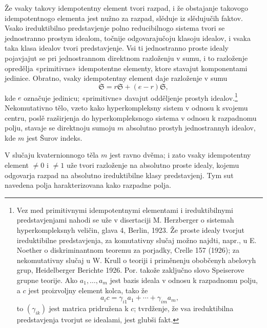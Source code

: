 \documentclass[11pt]{article}
\newcommand{\mS}{\mathfrak{S}}
\begin{document}
\noindent Že vsaky takovy idempotentny element tvori razpad, i že obstajanje takovogo idempotentnogo elementa jest nužno za razpad, slěduje iz slědujučih faktov. Vsako ireduktibilno predstavjenje polno reducibilnogo sistema tvori se jednostranno prostym idealom, točnije odgovarajučoju klasoju idealov, i vsaka taka klasa idealov tvori predstavjenje. Vsi ti jednostranno proste idealy pojavjajut se pri jednostrannom direktnom razloženju v sumu, i to razloženje opredělja «primitivne» idempotentne elementy, ktore stavajut komponentami jedinice. Obratno, vsaky idempotentny element daje razloženje v sumu
\[
        \mS=r\mS+(e-r)\mS,
\]
kde $e$ označuje jedinicu; «primitivne» davajut odděljenje prostyh idealov.\footnote{Vez med primitivnymi idempotentnymi elementami i ireduktibilnymi predstavjenjami nahodi se uže v disertaciji M. Herzberger o sistemah hyperkompleksnyh veličin, glava 4, Berlin, 1923. Že proste idealy tvorjut ireduktibilne predstavjenja, za komutativny slučaj možno najdti, napr., u E. Noether o diskriminantnom teoremu za porjadky, Crelle 157 (1926); za nekomutativny slučaj u W. Krull o teoriji i priměnenju obobčenyh abelovyh grup, Heidelberger Berichte 1926. Por. takože zaključno slovo Speiserove grupne teorije. Ako $a_1,\ldots,a_m$ jest bazis ideala v odnosu k razpadnomu polju, a $c$ jest proizvoljny element kolca, tako že
\[
        a_i c=\gamma_{i1}a_1+\cdots+\gamma_{im}a_m,
\]
to $(\gamma_{ik})$ jest matrica pridružena k $c$; tvrdženje, že vsa ireduktibilna predstavjenja tvorjut se idealami, jest glubši fakt.} Nekomutativno tělo, vzeto kako hyperkompleksny sistem v odnosu k svojemu centru, poslě razširjenja do hyperkompleksnogo sistema v odnosu k razpadnomu polju, stavaje se direktnoju sumoju $m$ absolutno prostyh jednostrannyh idealov, kde $m$ jest Šurov indeks.

\medskip

\noindent V slučaju kvaternionnogo těla $m$ jest ravno dvěma; i zato vsaky idempotentny element $\ne0$ i $\ne1$ uže tvori razloženje na absolutno proste idealy, kojemu odgovarja razpad na absolutno ireduktibilne klasy predstavjenj. Tym sut navedena polja harakterizovana kako razpadne polja.
\end{document}
